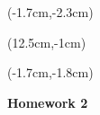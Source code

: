\documentclass[12pt, oneside]{article}
\begin{document}
\begin{textblock*}{4cm}(-1.7cm,-2.3cm)
\end{textblock*}

\begin{textblock*}{8cm}(12.5cm,-1cm)
\end{textblock*}
\begin{textblock*}{13.5cm}(-1.7cm,-1.8cm)
\end{textblock*}

\vspace{1cm}

\begin{center}
\textbf{\Large Homework 2}
\end{center}
\end{document}
